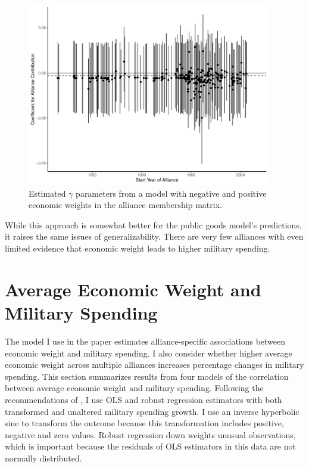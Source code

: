 \documentclass[12pt]{article}
\begin{document}
\begin{figure}[htbp]
	\centering
		\includegraphics[width=0.95\textwidth]{alliance-coefs-year-w.pdf}
	\caption{Estimated $\gamma$ parameters from a model with negative and positive economic weights in the alliance membership matrix.}
	\label{fig:alliance-coefs-year-w}
\end{figure}

While this approach is somewhat better for the public goods model's predictions, it raises the same issues of generalizability. 
There are very few alliances with even limited evidence that economic weight leads to higher military spending. 



\section{Average Economic Weight and Military Spending}


The model I use in the paper estimates alliance-specific associations between economic weight and military spending. 
I also consider whether higher average economic weight across multiple alliances increases percentage changes in military spending. 
This section summarizes results from four models of the correlation between average economic weight and military spending. 
Following the recommendations of \citet{RaineyBaissa2018}, I use OLS and robust regression estimators with both transformed and unaltered military spending growth.  
I use an inverse hyperbolic sine to transform the outcome because this transformation includes positive, negative and zero values. 
Robust regression down weights unusual observations, which is important because the residuals of OLS estimators in this data are not normally distributed. 
\end{document}
